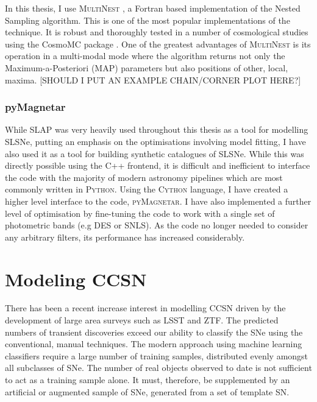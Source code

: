 In this thesis, I use \textsc{MultiNest} \citep{Feroz2009,Feroz2011,Feroz2013}, a Fortran based implementation of the Nested Sampling algorithm. This is one of the most popular implementations of the technique. It is robust and thoroughly tested in a number of cosmological studies using the CosmoMC package \citep{Lewis2002}. One of the greatest advantages of \textsc{MultiNest} is its operation in a multi-modal mode where the algorithm returns not only the Maximum-a-Posteriori (MAP) parameters but also positions of other, local, maxima. [SHOULD I PUT AN EXAMPLE CHAIN/CORNER PLOT HERE?]

\subsubsection{pyMagnetar}
While SLAP was very heavily used throughout this thesis as a tool for modelling SLSNe, putting an emphasis on the optimisations involving model fitting, I have also used it as a tool for building synthetic catalogues of SLSNe. While this was directly possible using the C++ frontend, it is difficult and inefficient to interface the code with the majority of modern astronomy pipelines which are most commonly written in \textsc{Python}. Using the \textsc{Cython} language, I have created a higher level interface to the code, \textsc{pyMagnetar}. I have also implemented a further level of optimisation by fine-tuning the code to work with a single set of photometric bands (e.g DES or SNLS). As the code no longer needed to consider any arbitrary filters, its performance has increased considerably.

\section{Modeling CCSN}
There has been a recent increase interest in modelling CCSN driven by the development of large area surveys such as LSST and ZTF. The predicted numbers of transient discoveries exceed our ability to classify the SNe using the conventional, manual techniques. The modern approach using machine learning classifiers require a large number of training samples, distributed evenly amongst all subclasses of SNe. The number of real objects observed to date is not sufficient to act as a training sample alone. It must, therefore, be supplemented by an artificial or augmented sample of SNe, generated from a set of template SN.

